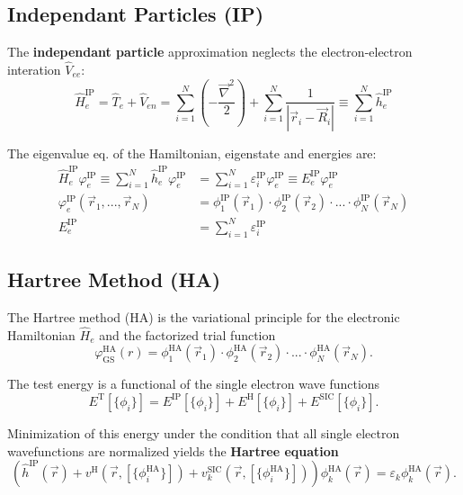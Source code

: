 \documentclass{article}
\newcommand{\lr}[1]{\left(#1\right)}
\begin{document}
\subsection{Independant Particles (IP)}
The \textbf{independant particle} approximation neglects the electron-electron interation $\hat{V}_{ee}$:
	\begin{equation}
		\hat{H}_e^\text{IP} = \hat{T}_e + \hat{V}_{en} = \sum_{i=1}^N \lr{ -\frac{\vec{\nabla}^2}{2} } + \sum_{i=1}^N \frac{1}{|\vec{r}_i - \vec{R}_i|} \equiv \sum_{i=1}^N \hat{h}_e^\text{IP}
	\end{equation}

The eigenvalue eq. of the Hamiltonian, eigenstate and energies are:
	\begin{align}
		\hat{H}_e^\text{IP} \varphi_e^\text{IP} \equiv \sum_{i=1}^N \hat{h}_e^\text{IP} \varphi_e^\text{IP} &= \sum_{i=1}^N \varepsilon_i^\text{IP} \varphi_e^\text{IP} \equiv E_e^\text{IP}  \varphi_e^\text{IP} \\
		\varphi_e^\text{IP}(\vec{r}_1, ..., \vec{r}_N) &= \phi_1^\text{IP}(\vec{r}_1) \cdot \phi_2^\text{IP}(\vec{r}_2) \cdot ... \cdot \phi_N^\text{IP}(\vec{r}_N) \\
		E_e^\text{IP} &= \sum_{i=1}^N \varepsilon_i^\text{IP}
	\end{align}



\newpage


\subsection{Hartree Method (HA)}
The Hartree method (HA) is the variational principle for the electronic Hamiltonian  $\hat{H}_e$ and the factorized trial function
	\begin{equation}
		\varphi_\text{GS}^\text{HA}(r) =  \phi_1^\text{HA}(\vec{r}_1) \cdot \phi_2^\text{HA}(\vec{r}_2) \cdot ... \cdot \phi_N^\text{HA}(\vec{r}_N).
	\end{equation}

The test energy is a functional of the single electron wave functions
	\begin{equation}
		E^\text{T}[\{\phi_i\}] = E^\text{IP}[\{\phi_i\}] + E^\text{H}[\{\phi_i\}] + E^\text{SIC}[\{\phi_i\}].
	\end{equation}

Minimization of this energy under the condition that all single electron wavefunctions are normalized yields the \textbf{Hartree equation}
	\begin{equation}
		\lr{ \hat{h}^\text{IP}(\vec{r}) + v^\text{H}(\vec{r},[\{\phi_i^\text{HA}\}]) + v_k^\text{SIC}(\vec{r}, [\{\phi_i^\text{HA}\}]) } \phi_k^\text{HA}(\vec{r}) = \varepsilon_k \phi_k^\text{HA}(\vec{r}).
	\end{equation}
\end{document}

